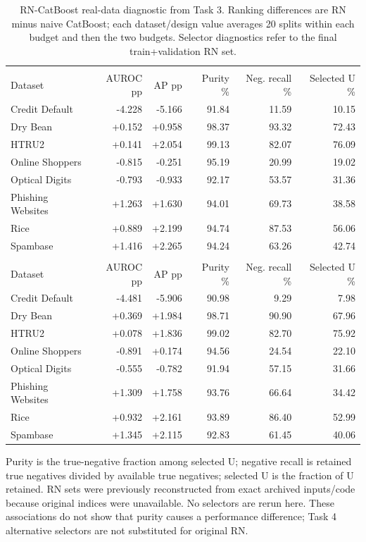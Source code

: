\begin{table}[t]
\centering
\caption{RN-CatBoost real-data diagnostic from Task 3. Ranking differences are RN minus naive CatBoost; each dataset/design value averages 20 splits within each budget and then the two budgets. Selector diagnostics refer to the final train+validation RN set.}
\label{tab:s-real-rn-diagnostic}
\small
\setlength{\tabcolsep}{3.5pt}
\renewcommand{\arraystretch}{1.08}
\begin{tabularx}{\textwidth}{>{\raggedright\arraybackslash}Xrrrrr}
\toprule
\multicolumn{6}{l}{\textbf{One-sample}}\\
Dataset & AUROC pp & AP pp & Purity \% & Neg. recall \% & Selected U \%\\
\midrule
Credit Default & -4.228 & -5.166 & 91.84 & 11.59 & 10.15 \\
Dry Bean & +0.152 & +0.958 & 98.37 & 93.32 & 72.43 \\
HTRU2 & +0.141 & +2.054 & 99.13 & 82.07 & 76.09 \\
Online Shoppers & -0.815 & -0.251 & 95.19 & 20.99 & 19.02 \\
Optical Digits & -0.793 & -0.933 & 92.17 & 53.57 & 31.36 \\
Phishing Websites & +1.263 & +1.630 & 94.01 & 69.73 & 38.58 \\
Rice & +0.889 & +2.199 & 94.74 & 87.53 & 56.06 \\
Spambase & +1.416 & +2.265 & 94.24 & 63.26 & 42.74 \\
\midrule
\multicolumn{6}{l}{\textbf{Two-sample}}\\
Dataset & AUROC pp & AP pp & Purity \% & Neg. recall \% & Selected U \%\\
\midrule
Credit Default & -4.481 & -5.906 & 90.98 & 9.29 & 7.98 \\
Dry Bean & +0.369 & +1.984 & 98.71 & 90.90 & 67.96 \\
HTRU2 & +0.078 & +1.836 & 99.02 & 82.70 & 75.92 \\
Online Shoppers & -0.891 & +0.174 & 94.56 & 24.54 & 22.10 \\
Optical Digits & -0.555 & -0.782 & 91.94 & 57.15 & 31.66 \\
Phishing Websites & +1.309 & +1.758 & 93.76 & 66.64 & 34.42 \\
Rice & +0.932 & +2.161 & 93.89 & 86.40 & 52.99 \\
Spambase & +1.345 & +2.115 & 92.83 & 61.45 & 40.06 \\
\bottomrule
\end{tabularx}
\par\medskip
\begin{minipage}{\textwidth}\small
Purity is the true-negative fraction among selected U; negative recall is retained true negatives divided by available true negatives; selected U is the fraction of U retained. RN sets were previously reconstructed from exact archived inputs/code because original indices were unavailable. No selectors are rerun here. These associations do not show that purity causes a performance difference; Task 4 alternative selectors are not substituted for original RN.
\end{minipage}
\end{table}
